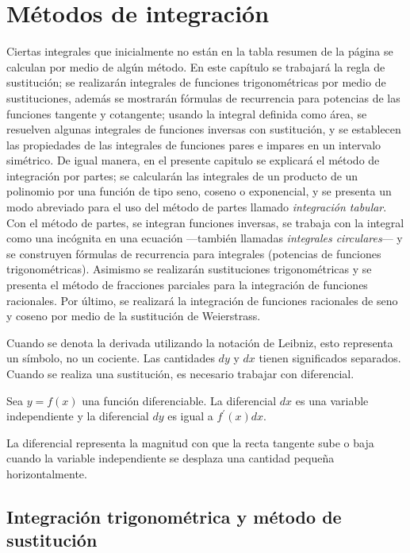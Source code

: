 \chapter{Métodos de integración}\label{MetodIntegrac}

Ciertas integrales que inicialmente no están en la tabla resumen de la página \pageref{TablaResumen} se calculan por medio de algún método. En este capítulo se trabajará la regla de sustitución; se realizarán integrales de funciones trigonométricas por medio de sustituciones, además se mostrarán fórmulas de recurrencia para potencias de las funciones tangente y cotangente; usando la integral definida como área, se resuelven algunas integrales de funciones inversas con sustitución, y se establecen las propiedades de las integrales de funciones pares e impares en un intervalo simétrico. De igual manera, en el presente capitulo se explicará el método de integración por partes; se calcularán las integrales de un producto de un polinomio por una función de tipo seno, coseno o exponencial, y se presenta un modo abreviado para el uso del método de partes llamado \textit{integración tabular}. Con el método de partes, se integran funciones inversas, se trabaja con la integral como una incógnita en una ecuación —también llamadas \textit{integrales circulares}— y se construyen fórmulas de recurrencia para integrales (potencias de funciones trigonométricas). Asimismo se realizarán sustituciones trigonométricas y se presenta el método de fracciones parciales para la integración de funciones racionales. Por último, se realizará la integración de funciones racionales de seno y coseno por medio de la sustitución de Weierstrass.

Cuando se denota la derivada utilizando la notación de Leibniz, esto representa un símbolo, no un cociente. Las cantidades $dy$ y $dx$ tienen significados separados.
Cuando se realiza una sustitución, es necesario trabajar con diferencial.

\begin{defi} 
 \textnormal{Sea \textit{$y=f(x)$} una función diferenciable. La diferencial \textit{$dx$} es una variable independiente y la diferencial \textit{$dy$} es igual a} $f^{\prime}(x)dx$.
\end{defi}

La diferencial representa la magnitud con que la recta tangente sube o baja cuando la variable independiente se desplaza una cantidad pequeña horizontalmente.

\section{Integración trigonométrica y método de sustitución}

